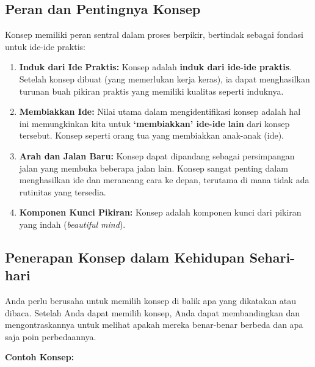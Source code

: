 \documentclass[
  letterpaper,
  DIV=11,
  numbers=noendperiod]{scrreprt}
\providecommand{\tightlist}{%
  \setlength{\itemsep}{0pt}\setlength{\parskip}{0pt}}
\begin{document}
\subsection{Peran dan Pentingnya
Konsep}\label{peran-dan-pentingnya-konsep}

Konsep memiliki peran sentral dalam proses berpikir, bertindak sebagai
fondasi untuk ide-ide praktis:

\begin{enumerate}
\def\labelenumi{\arabic{enumi}.}
\tightlist
\item
  \textbf{Induk dari Ide Praktis:} Konsep adalah \textbf{induk dari
  ide-ide praktis}. Setelah konsep dibuat (yang memerlukan kerja keras),
  ia dapat menghasilkan turunan buah pikiran praktis yang memiliki
  kualitas seperti induknya.
\item
  \textbf{Membiakkan Ide:} Nilai utama dalam mengidentifikasi konsep
  adalah hal ini memungkinkan kita untuk \textbf{`membiakkan' ide-ide
  lain} dari konsep tersebut. Konsep seperti orang tua yang membiakkan
  anak-anak (ide).
\item
  \textbf{Arah dan Jalan Baru:} Konsep dapat dipandang sebagai
  persimpangan jalan yang membuka beberapa jalan lain. Konsep sangat
  penting dalam menghasilkan ide dan merancang cara ke depan, terutama
  di mana tidak ada rutinitas yang tersedia.
\item
  \textbf{Komponen Kunci Pikiran:} Konsep adalah komponen kunci dari
  pikiran yang indah (\emph{beautiful mind}).
\end{enumerate}

\subsection{Penerapan Konsep dalam Kehidupan
Sehari-hari}\label{penerapan-konsep-dalam-kehidupan-sehari-hari}

Anda perlu berusaha untuk memilih konsep di balik apa yang dikatakan
atau dibaca. Setelah Anda dapat memilih konsep, Anda dapat membandingkan
dan mengontraskannya untuk melihat apakah mereka benar-benar berbeda dan
apa saja poin perbedaannya.

\textbf{Contoh Konsep:}
\end{document}
